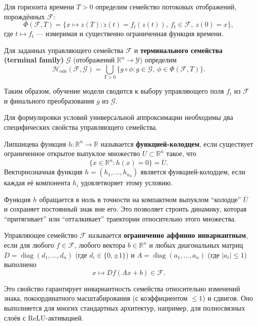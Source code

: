 \documentclass[../NDCNNAI_main.tex]{subfiles}
\begin{document}
\begin{definition}
Для горизонта времени $T > 0$ определим семейство потоковых отображений, порождённых $\mathcal{F}$:
\[
\Phi(\mathcal{F}, T) = \{ x \mapsto z(T) : \dot{z}(t) = f_t(z(t)), \ f_t \in \mathcal{F}, \ z(0) = x \},
\]
где $t \mapsto f_t$ --- измеримая и существенно ограниченная функция времени.
\end{definition}

\begin{definition}
Для заданных управляющего семейства $\mathcal{F}$ и \textbf{терминального семейства (terminal family)} $\mathcal{G}$ (отображений $\mathbb{R}^n \to \mathcal{Y}$) определим
\[
\mathcal{H}_{\text{ode}}(\mathcal{F}, \mathcal{G}) = \bigcup_{T>0} \{ g \circ \phi : g \in \mathcal{G}, \ \phi \in \Phi(\mathcal{F}, T) \}.
\]
\end{definition}

Таким образом, обучение модели сводится к выбору управляющего поля $f_t$ из $\mathcal{F}$ и финального преобразования $g$ из $\mathcal{G}$.

Для формулировки условий универсальной аппроксимации необходимы два специфических свойства управляющего семейства.

\begin{definition}
\label{def:well_function}
Липшицева функция $h\colon \mathbb{R}^n \to \mathbb{R}$ называется \textbf{функцией-колодцем}, если существует ограниченное открытое выпуклое множество $U \subset \mathbb{R}^n$ такое, что
\[
\{ x \in \mathbb{R}^n : h(x) = 0 \} = \overline{U}.
\]
Векторнозначная функция $h = (h_1, \ldots, h_{n_0})$ является функцией-колодцем, если каждая её компонента $h_i$ удовлетворяет этому условию.
\end{definition}
\begin{remark}
   Функция $h$ обращается в ноль в точности на компактном выпуклом ``колодце'' $\overline{U}$ и сохраняет постоянный знак вне его. Это позволяет строить динамику, которая ``притягивает'' или ``отталкивает'' траектории относительно этого множества.
\end{remark}

\begin{definition}
\label{def:restricted_affine_invariance}
Управляющее семейство $\mathcal{F}$ называется \textbf{ограниченно аффинно инвариантным}, если для любого $f \in \mathcal{F}$, любого вектора $b \in \mathbb{R}^n$ и любых диагональных матриц $D = \operatorname{diag}(d_1, \ldots, d_n)$ (где $d_i \in \{0, \pm 1\}$) и $A = \operatorname{diag}(a_1, \ldots, a_n)$ (где $|a_i| \leq 1$) выполнено
\[
x \mapsto D f(Ax + b) \in \mathcal{F}.
\]
\end{definition}
Это свойство гарантирует инвариантность семейства относительно изменений знака, покоординатного масштабирования (с коэффициентом $\leq 1$) и сдвигов. Оно выполняется для многих стандартных архитектур, например, для полносвязных слоёв с ReLU-активацией.
\end{document}

